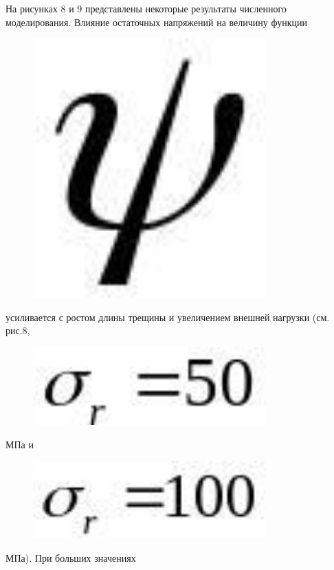 На рисунках 8 и 9 представлены некоторые результаты численного
моделирования. Влияние остаточных напряжений на величину функции
\begin{figure}[H]
	\centering
	\includegraphics[width=0.8\textwidth]{assets/1230}
	\caption*{}
\end{figure} усиливается с ростом длины трещины
и увеличением внешней нагрузки (см. рис.8,
\begin{figure}[H]
	\centering
	\includegraphics[width=0.8\textwidth]{assets/1231}
	\caption*{}
\end{figure}МПа и
\begin{figure}[H]
	\centering
	\includegraphics[width=0.8\textwidth]{assets/1232}
	\caption*{}
\end{figure}МПа). При больших значениях
